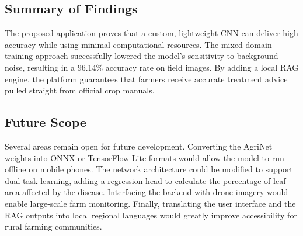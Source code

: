 \documentclass[12pt, a4paper]{report}
\begin{document}
\subsection{Summary of Findings}
The proposed application proves that a custom, lightweight CNN can deliver high accuracy while using minimal computational resources. The mixed-domain training approach successfully lowered the model's sensitivity to background noise, resulting in a 96.14\% accuracy rate on field images. By adding a local RAG engine, the platform guarantees that farmers receive accurate treatment advice pulled straight from official crop manuals.

\subsection{Future Scope}
Several areas remain open for future development. Converting the AgriNet weights into ONNX or TensorFlow Lite formats would allow the model to run offline on mobile phones. The network architecture could be modified to support dual-task learning, adding a regression head to calculate the percentage of leaf area affected by the disease. Interfacing the backend with drone imagery would enable large-scale farm monitoring. Finally, translating the user interface and the RAG outputs into local regional languages would greatly improve accessibility for rural farming communities.
\end{document}
